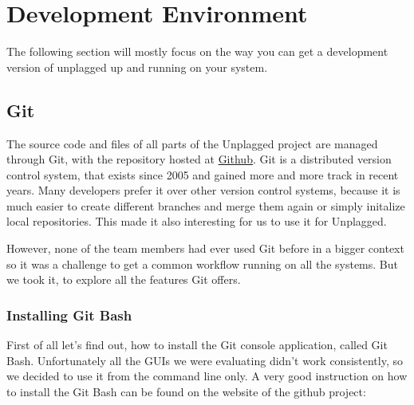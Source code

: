\section{Development Environment}

The following section will mostly focus on the way you can get a development version of unplagged up and running on your 
system.

\subsection{Git}
The source code and files of all parts of the Unplagged project are managed through Git, 
with the repository hosted at \href{https://github.com}{Github}. 
Git is a distributed version control system, that exists since 2005 and gained more and more 
track in recent years. Many developers prefer it over other version control systems, because it is much easier 
to create different branches and merge them again or simply initalize local repositories. This
made it also interesting for us to use it for Unplagged. %

However, none of the team members had ever used 
Git before in a bigger context so it was a challenge to get a common workflow running on all the systems. But we took it, 
to explore all the 
features Git offers.




\subsubsection{Installing Git Bash}

First of all let's find out, how to install the Git console application, called Git Bash. 
Unfortunately all the GUIs we were evaluating didn't work consistently, so we decided to use it from the command line 
only. 
A very good instruction on how to install the Git Bash can be found on the website of the github project:


